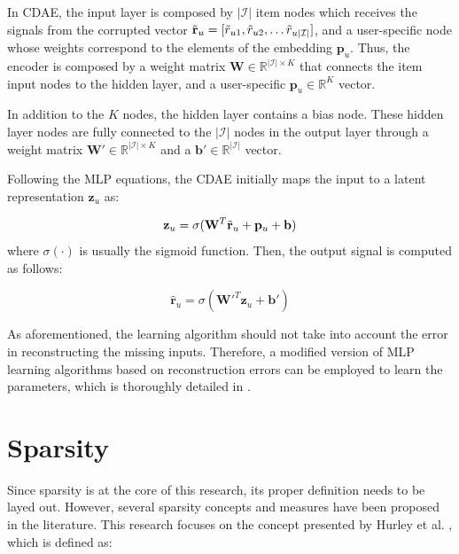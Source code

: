     In CDAE, the input layer is composed by $|\mathcal{I}|$ item nodes which receives the signals from the corrupted vector $\Tilde{\mathbf{r}}_u = [\Tilde{r}_{u1}, \Tilde{r}_{u2}, \ldots \Tilde{r}_{u|\mathcal{I}|}]$, and a user-specific node whose weights correspond to the elements of the embedding $\mathbf{p}_u$. Thus, the encoder is composed by a weight matrix $\mathbf{W} \in \mathbb{R}^{|\mathcal{I}| \times K}$ that connects the item input nodes to the hidden layer, and a user-specific $\mathbf{p}_u \in \mathbb{R}^K$ vector. 

    In addition to the $K$ nodes, the hidden layer contains a bias node. These hidden layer nodes are fully connected to the $|\mathcal{I}|$ nodes in the output layer through a weight matrix $\mathbf{W}' \in \mathbb{R}^{|\mathcal{I}| \times K}$ and a $\mathbf{b}' \in \mathbb{R}^{|\mathcal{I}|}$ vector. 
    
    Following the MLP equations, the CDAE initially maps the input to a latent representation $\mathbf{z}_u$ as:
    
    \begin{equation*}
        \mathbf{z}_u = \sigma(\mathbf{W}^T \Tilde{\mathbf{r}}_{u} + \mathbf{p}_u + \mathbf{b})
    \end{equation*} where $\sigma(\cdot)$ is usually the sigmoid function. Then, the output signal is computed as follows:
    
    \begin{equation*}
        \hat{\mathbf{r}}_{u} = \sigma(\mathbf{W}'^T\mathbf{z}_u + \mathbf{b}')
    \end{equation*}

    As aforementioned, the learning algorithm should not take into account the error in reconstructing the missing inputs. Therefore, a modified version of MLP learning algorithms based on reconstruction errors can be employed to learn the parameters, which is thoroughly detailed in \cite{10.1145/2835776.2835837}.

\section{Sparsity}

    Since sparsity is at the core of this research, its proper definition needs to be layed out. However, several sparsity concepts and measures have been proposed in the literature. This research focuses on the concept presented by Hurley et al. \cite{10.1109/TIT.2009.2027527}, which is defined as: 
    
